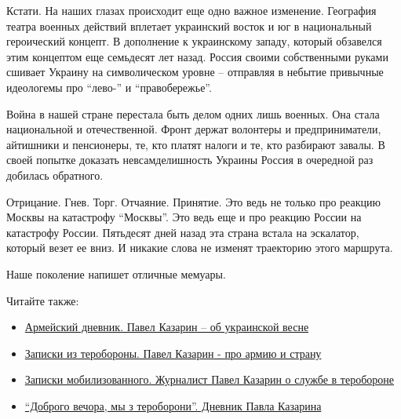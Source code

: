 Кстати. На наших глазах происходит еще одно важное изменение. География театра
военных действий вплетает украинский восток и юг в национальный героический
концепт. В дополнение к украинскому западу, который обзавелся этим концептом
еще семьдесят лет назад. Россия своими собственными руками сшивает Украину на
символическом уровне – отправляя в небытие привычные идеологемы про \enquote{лево-} и
\enquote{правобережье}.

Война в нашей стране перестала быть делом одних лишь военных. Она стала
национальной и отечественной. Фронт держат волонтеры и предприниматели,
айтишники и пенсионеры, те, кто платят налоги и те, кто разбирают завалы. В
своей попытке доказать невсамделишность Украины Россия в очередной раз добилась
обратного.

Отрицание. Гнев. Торг. Отчаяние. Принятие. Это ведь не только про реакцию
Москвы на катастрофу \enquote{Москвы}. Это ведь еще и про реакцию России на катастрофу
России. Пятьдесят дней назад эта страна встала на эскалатор, который везет ее
вниз. И никакие слова не изменят траекторию этого маршрута.

Наше поколение напишет отличные мемуары.

Читайте также: 

\begin{itemize}
  \item \href{https://www.pravda.com.ua/rus/articles/2022/04/3/7336826/}{Армейский дневник. Павел Казарин – об украинской весне}
  \item \href{https://www.pravda.com.ua/rus/articles/2022/03/27/7334825/}{Записки из теробороны. Павел Казарин - про армию и страну}
  \item \href{https://www.pravda.com.ua/rus/articles/2022/03/20/7332890/}{Записки мобилизованного. Журналист Павел Казарин о службе в теробороне}
  \item \href{https://www.pravda.com.ua/rus/articles/2022/04/10/7338575/}{\enquote{Доброго вечора, мы з тероборони}. Дневник Павла Казарина}
\end{itemize}

